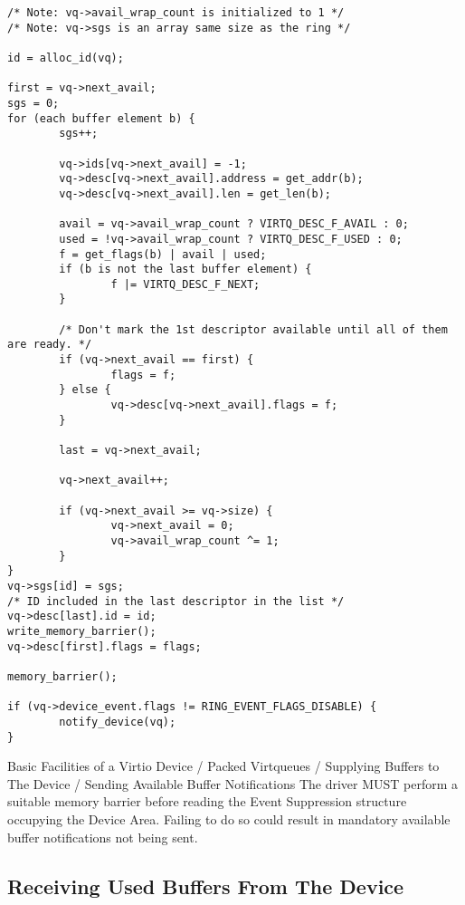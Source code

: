 \begin{lstlisting}
/* Note: vq->avail_wrap_count is initialized to 1 */
/* Note: vq->sgs is an array same size as the ring */

id = alloc_id(vq);

first = vq->next_avail;
sgs = 0;
for (each buffer element b) {
        sgs++;

        vq->ids[vq->next_avail] = -1;
        vq->desc[vq->next_avail].address = get_addr(b);
        vq->desc[vq->next_avail].len = get_len(b);

        avail = vq->avail_wrap_count ? VIRTQ_DESC_F_AVAIL : 0;
        used = !vq->avail_wrap_count ? VIRTQ_DESC_F_USED : 0;
        f = get_flags(b) | avail | used;
        if (b is not the last buffer element) {
                f |= VIRTQ_DESC_F_NEXT;
        }

        /* Don't mark the 1st descriptor available until all of them are ready. */
        if (vq->next_avail == first) {
                flags = f;
        } else {
                vq->desc[vq->next_avail].flags = f;
        }

        last = vq->next_avail;

        vq->next_avail++;

        if (vq->next_avail >= vq->size) {
                vq->next_avail = 0;
                vq->avail_wrap_count ^= 1;
        }
}
vq->sgs[id] = sgs;
/* ID included in the last descriptor in the list */
vq->desc[last].id = id;
write_memory_barrier();
vq->desc[first].flags = flags;

memory_barrier();

if (vq->device_event.flags != RING_EVENT_FLAGS_DISABLE) {
        notify_device(vq);
}

\end{lstlisting}


 {Basic Facilities of a Virtio Device / Packed Virtqueues / Supplying Buffers to The Device / Sending Available Buffer Notifications}
The driver MUST perform a suitable memory barrier before reading
the Event Suppression structure occupying the Device Area. Failing
to do so could result in mandatory available buffer notifications
not being sent.

\subsection{Receiving Used Buffers From The Device}\label{sec:Basic Facilities of a Virtio Device / Packed Virtqueues / Receiving Used Buffers From The Device}

